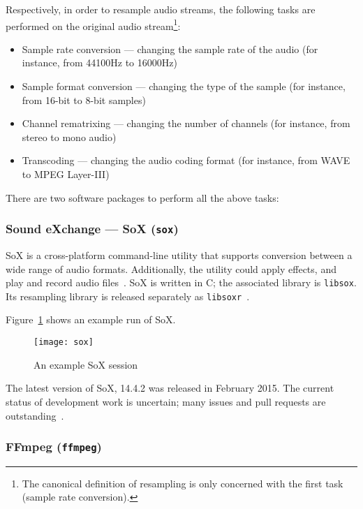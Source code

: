 Respectively, in order to resample audio streams, the following tasks
are performed on the original audio stream\footnote{The canonical
definition of resampling is only concerned with the first task
(sample rate conversion).}:

\begin{itemize}
    \item Sample rate conversion --- changing the sample rate of the audio
    (for instance, from 44100Hz to 16000Hz)
    \item Sample format conversion --- changing the type of the sample
    (for instance, from 16-bit to 8-bit samples)
    \item Channel rematrixing --- changing the number of channels
    (for instance, from stereo to mono audio)
    \item Transcoding --- changing the audio coding format (for instance,
    from WAVE to MPEG Layer-III)
\end{itemize}

There are two software packages to perform all the above tasks:

\subsubsection{Sound eXchange --- SoX (\texttt{sox})}

SoX is a cross-platform command-line utility that supports conversion
between a wide range of audio formats. Additionally, the utility could
apply effects, and play and record audio files~\cite{sox-docs}.
SoX is written in C\@; the associated library is \texttt{libsox}. Its
resampling library is released separately as
\texttt{libsoxr}~\cite{sox}.

Figure~\ref{sox} shows an example run of SoX.

\begin{figure}[ht]
\begin{center}
    \texttt{[image: sox]}
    \caption{An example SoX session~\cite{sox}}\label{sox}
\end{center}
\end{figure}

The latest version of SoX, 14.4.2 was released in February 2015. The
current status of development work is uncertain; many issues and pull
requests are outstanding~\cite{sox-cl}.

\subsubsection{FFmpeg (\texttt{ffmpeg})}

